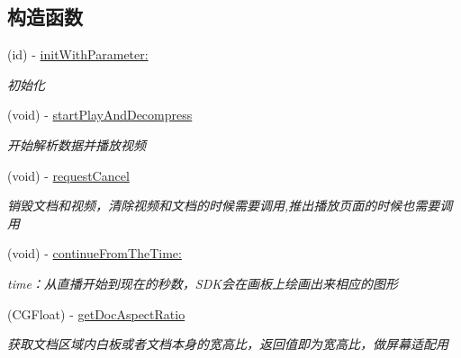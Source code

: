 \subsection*{构造函数}
\begin{DoxyCompactItemize}
\item 
(id) -\/ \hyperlink{interface_offline_play_back_af03e324fc6ecf88ef231c945de5b1a5c}{init\+With\+Parameter\+:}
\begin{DoxyCompactList}\small\item\em 初始化 \end{DoxyCompactList}\item 
\mbox{\label{interface_offline_play_back_a066a30821438528546ac1f4ed205975d}} 
(void) -\/ \hyperlink{interface_offline_play_back_a066a30821438528546ac1f4ed205975d}{start\+Play\+And\+Decompress}
\begin{DoxyCompactList}\small\item\em 开始解析数据并播放视频 \end{DoxyCompactList}\item 
\mbox{\label{interface_offline_play_back_a7b71e7e41545db196953fe6bc3462b35}} 
(void) -\/ \hyperlink{interface_offline_play_back_a7b71e7e41545db196953fe6bc3462b35}{request\+Cancel}
\begin{DoxyCompactList}\small\item\em 销毁文档和视频，清除视频和文档的时候需要调用,推出播放页面的时候也需要调用 \end{DoxyCompactList}\item 
\mbox{\label{interface_offline_play_back_a8078e7716f7c41146c094b6fd637c924}} 
(void) -\/ \hyperlink{interface_offline_play_back_a8078e7716f7c41146c094b6fd637c924}{continue\+From\+The\+Time\+:}
\begin{DoxyCompactList}\small\item\em time：从直播开始到现在的秒数，\+S\+D\+K会在画板上绘画出来相应的图形 \end{DoxyCompactList}\item 
\mbox{\label{interface_offline_play_back_aa9822fbb0c3958a1ac4cb9fd48cc5450}} 
(C\+G\+Float) -\/ \hyperlink{interface_offline_play_back_aa9822fbb0c3958a1ac4cb9fd48cc5450}{get\+Doc\+Aspect\+Ratio}
\begin{DoxyCompactList}\small\item\em 获取文档区域内白板或者文档本身的宽高比，返回值即为宽高比，做屏幕适配用 \end{DoxyCompactList}\item 

\end{DoxyCompactItemize}
